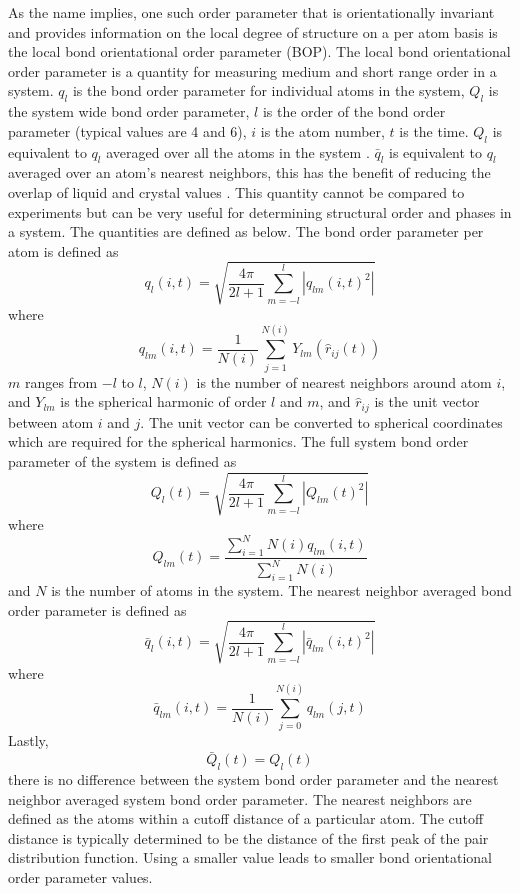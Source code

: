 As the name implies, one such order parameter that is orientationally invariant and provides information on the local degree of structure on a per atom basis is the local bond orientational order parameter (BOP).  The local bond orientational order parameter is a quantity for measuring medium and short range order in a system.
$q_l$ is the bond order parameter for individual atoms in the system, $Q_l$ is the system wide bond order parameter, $l$ is the order of the bond order parameter (typical values are 4 and 6), $i$ is the atom number, $t$ is the time. $Q_l$ is equivalent to $q_l$ averaged over all the atoms in the system \cite{BOP_first}. $\bar{q}_l$ is equivalent to $q_l$ averaged over an atom's nearest neighbors, this has the benefit of reducing the overlap of liquid and crystal values \cite{BOP}. This quantity cannot be compared to experiments but can be very useful for determining structural order and phases in a system. The quantities are defined as below. The bond order parameter per atom is defined as
\begin{equation}
q_l(i,t) = \sqrt{\frac{4\pi}{2l+1} \sum_{m=-l}^l\left|q_{lm}(i,t)^2\right|}
\end{equation}
where
\begin{equation}
q_{lm}(i,t) = \frac{1}{N(i)}\sum_{j=1}^{N(i)}Y_{lm}(\hat{r}_{ij}(t))
\end{equation}
$m$ ranges from $-l$ to $l$, $N(i)$ is the number of nearest neighbors around atom $i$, and $Y_{lm}$ is the spherical harmonic of order $l$ and $m$, and $\hat{r}_{ij}$ is the unit vector between atom $i$ and $j$. The unit vector can be converted to spherical coordinates which are required for the spherical harmonics. The full system bond order parameter of the system is defined as
\begin{equation}
Q_l(t) = \sqrt{\frac{4\pi}{2l+1} \sum_{m=-l}^l\left|Q_{lm}(t)^2\right|}
\end{equation}
where 
\begin{equation}
Q_{lm}(t) = \frac{\sum_{i=1}^NN(i)q_{lm}(i,t)}{\sum_{i=1}^NN(i)}
\end{equation}
and $N$ is the number of atoms in the system. The nearest neighbor averaged bond order parameter is defined as
\begin{equation}
\bar{q}_l(i,t) = \sqrt{\frac{4\pi}{2l+1} \sum_{m=-l}^l\left|\bar{q}_{lm}(i,t)^2\right|}
\end{equation}
where
\begin{equation}
\bar{q}_{lm}(i,t) = \frac{1}{N(i)}\sum_{j=0}^{N(i)}q_{lm}(j,t)
\end{equation}
Lastly,
\begin{equation}
\bar{Q}_l(t) = Q_l(t)
\end{equation}
there is no difference between the system bond order parameter and the nearest neighbor averaged system bond order parameter.  The nearest neighbors are defined as the atoms within a cutoff distance of a particular atom.  The cutoff distance is typically determined to be the distance of the first peak of the pair distribution function.  Using a smaller value leads to smaller bond orientational order parameter values.

